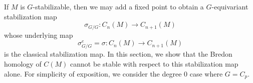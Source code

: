 \documentclass[11pt]{amsart}
\newtheorem{proposition}[equation]{Proposition}
\theoremstyle{definition}
\numberwithin{equation}{subsection} %
\def\f{\mathbb{F}}
\def\z{\mathbb{Z}}
\def\coker{\operatorname{coker}}
\def\mfz{\underline{\mathbb{Z}}}
\begin{document}
If $M$ is $G$-stabilizable, then we may add a fixed point to obtain a $G$-equivariant stabilization map
$$\sigma_{G/G}: C_n(M) \to C_{n+1}(M)$$
whose underlying map
$$\sigma_{G/G}^e = \sigma : C_n(M) \to C_{n+1}(M)$$
is the classical stabilization map. In this section, we show that the Bredon homology of $C(M)$ cannot be stable with respect to this stabilization map alone. For simplicity of exposition, we consider the degree 0 case where $G=C_p$.



\end{document}
